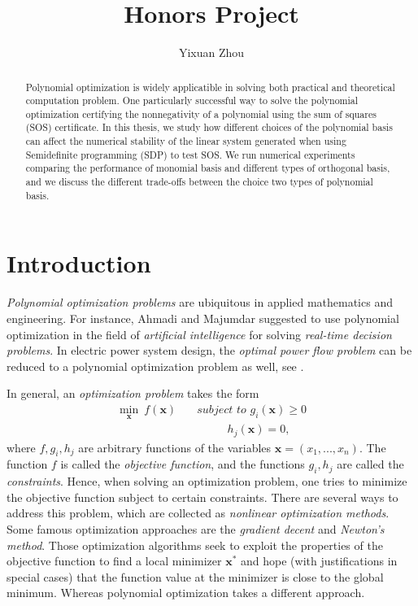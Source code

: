 \documentclass[12pt]{amsart}
\title{Honors Project}
\author{Yixuan Zhou} %
\numberwithin{equation}{section}
\theoremstyle{definition}
\numberwithin{thm}{section}
\begin{document}
 

\begin{abstract}
Polynomial optimization is widely applicatible in solving both practical and theoretical computation problem. 
One particularly successful way to solve the polynomial optimization certifying the nonnegativity of a polynomial using 
the sum of squares (SOS) certificate. In this thesis, we study how different choices of 
the polynomial basis can affect the numerical stability of the linear system generated when using Semidefinite programming (SDP) to 
test SOS. We run numerical experiments comparing the performance of monomial basis and different types of 
orthogonal basis, and we discuss the different trade-offs between the choice two types of polynomial basis. 
\end{abstract}

\maketitle


\section{Introduction} 

\emph{Polynomial optimization problems} are ubiquitous in applied mathematics and engineering. 
For instance, Ahmadi and Majumdar \cite{ahmadi2015applications} suggested to use
polynomial optimization in the field of \emph{artificial intelligence} for solving
\emph{real-time decision problems}. 
In electric power system design, the \emph{optimal power flow problem}
can be reduced to a polynomial optimization problem as well, see \cite{josz:tel-01478431}.

In general, an \emph{optimization problem} takes the form 
\begin{equation}
     \label{eq:optimization problem}
     \begin{split}
          \min_{\mathbf{x}} \ f(\mathbf{x}) & \quad \textit{subject to } g_i(\mathbf{x}) \geq 0 \\
          & \quad \quad \quad \text{ \ \ \ \ \ \  } h_j(\mathbf{x}) = 0, 
     \end{split}
 \end{equation}
where $f, g_i, h_j$ are arbitrary functions of the variables $\mathbf{x} = (x_1, ..., x_n)$. 
The function $f$ is called the \emph{objective function}, and the functions $g_i, h_j$ are called the \emph{constraints}.
Hence, when solving an optimization problem, one tries to minimize the objective function subject to certain constraints.
There are several ways to address this problem, which are collected as \emph{nonlinear optimization methods}. 
Some famous optimization approaches are the \emph{gradient decent} and \emph{Newton's method}. 
Those optimization algorithms seek to exploit the properties of the objective function to find a
local minimizer $\mathbf{x}^*$ and hope (with justifications in special cases) that the function value at the minimizer is close
to the global minimum. Whereas polynomial optimization takes a different approach.
\end{document}
